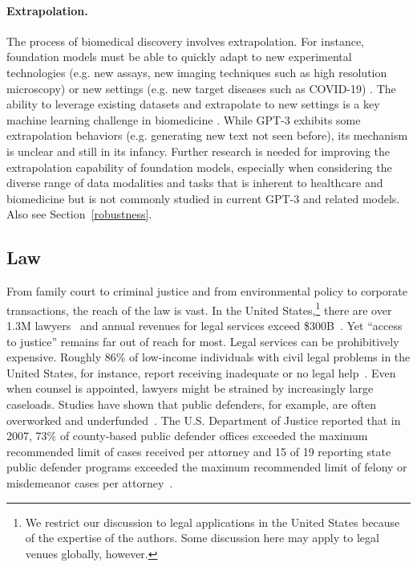 \paragraph{Extrapolation.}
The process of biomedical discovery involves extrapolation. For instance, foundation models must be able to quickly adapt to new experimental technologies (e.g. new assays, new imaging techniques such as high resolution microscopy) or new settings (e.g. new target diseases such as COVID-19) \citep{jaroch2018cell,benam2019exploring}. The ability to leverage existing datasets and extrapolate to new settings is a key machine learning challenge in biomedicine \cite{snell2017prototypical, ma2021few}. While GPT-3 exhibits some extrapolation behaviors (e.g. generating new text not seen before), its mechanism is unclear and still in its infancy. Further research is needed for improving the extrapolation capability of foundation models, especially when considering the diverse range of data modalities and tasks that is inherent to healthcare and biomedicine but is not commonly studied in current GPT-3 and related models. Also see Section~\ref{robustness}. 

\newsection
\subsection{Law}
\label{sec:law}

From family court to criminal justice and from environmental policy to corporate transactions, the reach of the law is vast. In the United States,\footnote{We restrict our discussion to legal applications in the United States because of the expertise of the authors. Some discussion here may apply to legal venues globally, however.} there are over 1.3M lawyers~\citep{aba2021lawyer} and annual revenues for legal services exceed \$300B~\citep{marketline2020legalservices}.  Yet ``access to justice''  remains far out of reach for most. Legal services can be prohibitively expensive. Roughly 86\% of low-income individuals with civil legal problems in the United States, for instance, report receiving inadequate or no legal help~\citep{lsc2017justice}. Even when counsel is appointed, lawyers might be strained by increasingly large caseloads. Studies have shown that public defenders, for example, are often overworked and underfunded~\citep{nrcc2009justice,nacdl2012national,aba2004gideon}. The U.S. Department of Justice reported that in 2007, 73\% of county-based public defender offices exceeded the maximum recommended limit of cases received per attorney and 15 of 19 reporting state public defender programs exceeded the maximum recommended limit of felony or misdemeanor cases per attorney~\citep{doj2010county,doj2010state}. 

